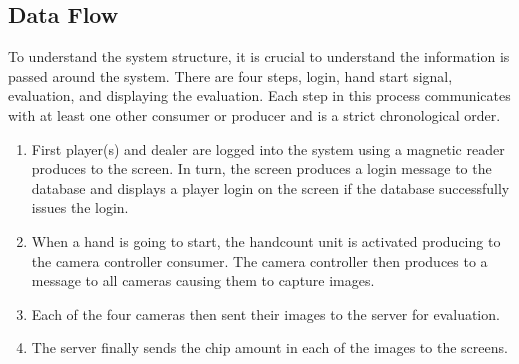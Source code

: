 \documentclass[12pt]{report}
\begin{document}
\subsection*{Data Flow}
To understand the system structure, it is crucial to understand the information is passed around the system. There are four steps, login, hand start signal, evaluation, and displaying the evaluation. Each step in this process communicates with at least one other consumer or producer and is a strict chronological order.

\begin{enumerate}
  \item First player(s) and dealer are logged into the system using a magnetic reader produces to the screen. In turn, the screen produces a login message to the database and displays a player login on the screen if the database successfully issues the login.
  
  \item When a hand is going to start, the handcount unit is activated producing to the camera controller consumer. The camera controller then produces to a message to all cameras causing them to capture images.
  
  \item Each of the four cameras then sent their images to the server for evaluation.
  
  \item The server finally sends the chip amount in each of the images to the screens.

\end{enumerate}
\end{document}
